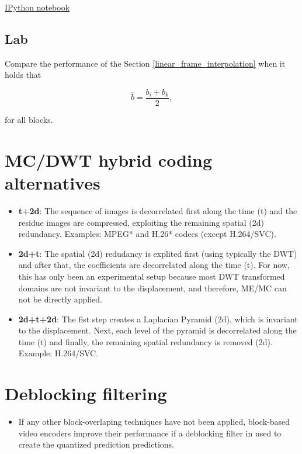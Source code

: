 {\href{https://nbviewer.jupyter.org/github/vicente-gonzalez-ruiz/video_coding/blob/master/subpixel_accuracy.ipynb}{IPython notebook}

\subsection{Lab}
Compare the performance of the Section \ref{linear_frame_interpolation}
when it holds that

\begin{equation}
   \hat{b} = \frac{b_i + b_k}{2},
\end{equation}

for all blocks.

\section{MC/DWT hybrid coding alternatives}
\begin{itemize}
\item
  \textbf{t+2d}: The sequence of images is decorrelated first along the
  time (t) and the residue images are compressed, exploiting the
  remaining spatial (2d) redundancy. Examples: MPEG* and H.26* codecs
  (except H.264/SVC).
\item
  \textbf{2d+t}: The spatial (2d) redudancy is explited first (using
  typically the DWT) and after that, the coefficients are decorrelated
  along the time (t). For now, this has only been an experimental setup
  because most DWT transformed domains are not invariant to the
  displacement, and therefore, ME/MC can not be directly applied.
\item
  \textbf{2d+t+2d}: The fist step creates a Laplacian Pyramid (2d),
  which is invariant to the displacement. Next, each level of the
  pyramid is decorrelated along the time (t) and finally, the remaining
  spatial redundancy is removed (2d). Example: H.264/SVC.
\end{itemize}


\section{Deblocking filtering}
\begin{itemize}
\tightlist
\item
  If any other block-overlaping techniques have not been applied,
  block-based video encoders improve their performance if a deblocking
  filter in used to create the quantized prediction predictions.
\end{itemize}

}
